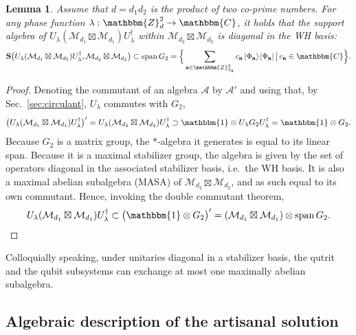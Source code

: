 \documentclass[aps,nofootinbib,floatfix,a4paper]{revtex4}
\newtheorem{lemma}[theorem]{Lemma}
\newcommand{\1}{\mbox{$\mathbf{1}$}}
\def\Spp{{\bf S}}
\def\ZZ{\mathbbm{Z}}
\def\CC{\mathbbm{C}}
\def\A{\mathcal{A}}
\def\M{\mathcal{M}}
\def\Id{\mathbbm{1}}
\DeclareMathOperator{\Span}{span}
\renewcommand{\vec}{\mathbf}
\begin{document}
\begin{lemma}\label{lem:support}
	Assume that $d=d_1d_2$ is the product of two co-prime numbers.
	For any phase function $\lambda:\ZZ_d^2\to \CC$,
	it holds that the support algebra of $U_\lambda (\M_{d_1}\boxtimes \M_{d_1}) U_\lambda^\dagger$
	within $\M_{d_2} \boxtimes \M_{d_2}$
	is diagonal in the WH basis:
	\begin{align*}
		\Spp\big(
			U_\lambda (\M_{d_1}\boxtimes \M_{d_1}) U_\lambda^\dagger,
			\M_{d_2} \boxtimes \M_{d_2}
		\big)
		\subset 
		\Span G_{2}
		=
		\Big\{ 
			\sum_{\vec a\in\ZZ_{d_2}^2} c_{\vec a} \, |\Phi_{\vec a}\rangle\langle \Phi_{\vec a}| \,\big|\, c_{\vec a} \in \CC
		\Big\}
		.
	\end{align*}
\end{lemma}

\begin{proof}
	Denoting the commutant of an algebra $\A$ by $\A'$ and using that, by Sec.~\ref{sec:circulant}, $U_\lambda$ commutes with $G_2$,
	\begin{align*}
		\big(U_\lambda (\M_{d_1}\boxtimes \M_{d_1}) U_\lambda^\dagger \big)'
		=
		U_\lambda (\M_{d_2}\boxtimes \M_{d_2}) U_\lambda^\dagger 
		\supset
		\Id
		\otimes
		U_\lambda G_2 U_\lambda^\dagger
		=
		\Id
		\otimes
		G_2.
	\end{align*}
	Because $G_2$ is a matrix group, the $*$-algebra it generates is equal to its linear span.
	Because it is a maximal stabilizer group, the algebra is given by the set of operators diagonal in the associated stabilizer basis, i.e.\ the WH basis.
	It is also a maximal abelian subalgebra (MASA) of $\M_{d_2}\boxtimes \M_{d_2}$, and as such equal to its own commutant.
	Hence, invoking the double commutant theorem,
	\begin{align*}
		U_\lambda (\M_{d_1}\boxtimes \M_{d_1}) U_\lambda^\dagger 
		\subset
		\big(
			\Id
			\otimes
			G_2
		\big)'
		=
		(\M_{d_1}\boxtimes \M_{d_1})
		\otimes
		\Span G_2.
	\end{align*}
\end{proof}

Colloquially speaking, under unitaries diagonal in a stabilizer basis, the qutrit and the qubit subsystems can exchange at most one maximally abelian subalgebra.

%




\subsection{Algebraic description of the artisanal solution}
\end{document}
